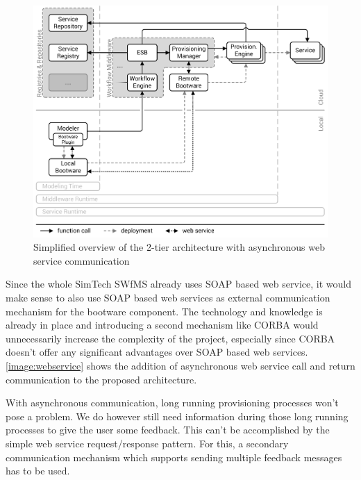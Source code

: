 \begin{figure}[!htbp]
	\centering
	\includegraphics[resolution=600]{design/assets/webservice}
	\caption{Simplified overview of the 2-tier architecture with asynchronous web service communication}
	\label{image:webservice}
\end{figure}

Since the whole SimTech SWfMS already uses SOAP based web service, it would make sense to also use SOAP based web services as external communication mechanism for the bootware component.
The technology and knowledge is already in place and introducing a second mechanism like CORBA would unnecessarily increase the complexity of the project, especially since CORBA doesn't offer any significant advantages over SOAP based web services.
\autoref{image:webservice} shows the addition of asynchronous web service call and return communication to the proposed architecture.

With asynchronous communication, long running provisioning processes won't pose a problem.
We do however still need information during those long running processes to give the user some feedback.
This can't be accomplished by the simple web service request/response pattern.
For this, a secondary communication mechanism which supports sending multiple feedback messages has to be used.

